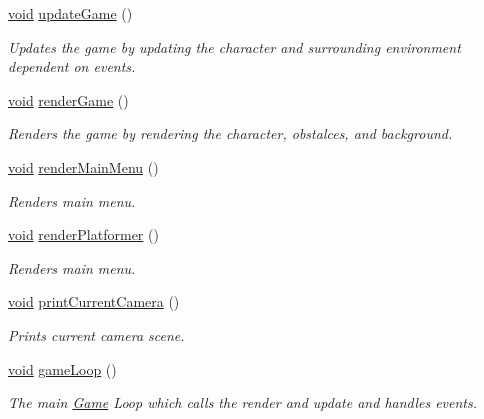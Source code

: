 \begin{DoxyCompactItemize}
\mbox{\hyperlink{_s_d_l__opengles2__gl2ext_8h_ae5d8fa23ad07c48bb609509eae494c95}{void}} \mbox{\hyperlink{class_game_a67a8c5c0356c9ad33fac1abc435a3746}{update\+Game}} ()
\begin{DoxyCompactList}\small\item\em Updates the game by updating the character and surrounding environment dependent on events. \end{DoxyCompactList}\item 
\mbox{\hyperlink{_s_d_l__opengles2__gl2ext_8h_ae5d8fa23ad07c48bb609509eae494c95}{void}} \mbox{\hyperlink{class_game_a4573580347746dbb7dbe568383682ed3}{render\+Game}} ()
\begin{DoxyCompactList}\small\item\em Renders the game by rendering the character, obstalces, and background. \end{DoxyCompactList}\item 
\mbox{\hyperlink{_s_d_l__opengles2__gl2ext_8h_ae5d8fa23ad07c48bb609509eae494c95}{void}} \mbox{\hyperlink{class_game_a9c9dea0cba2587b634793698e0e2d65c}{render\+Main\+Menu}} ()
\begin{DoxyCompactList}\small\item\em Renders main menu. \end{DoxyCompactList}\item 
\mbox{\hyperlink{_s_d_l__opengles2__gl2ext_8h_ae5d8fa23ad07c48bb609509eae494c95}{void}} \mbox{\hyperlink{class_game_a491f785f3a69e7d9d6539a384f00b28b}{render\+Platformer}} ()
\begin{DoxyCompactList}\small\item\em Renders main menu. \end{DoxyCompactList}\item 
\mbox{\hyperlink{_s_d_l__opengles2__gl2ext_8h_ae5d8fa23ad07c48bb609509eae494c95}{void}} \mbox{\hyperlink{class_game_a0aa4abcb959f9b7c4774fac5cb5f2162}{print\+Current\+Camera}} ()
\begin{DoxyCompactList}\small\item\em Prints current camera scene. \end{DoxyCompactList}\item 
\mbox{\hyperlink{_s_d_l__opengles2__gl2ext_8h_ae5d8fa23ad07c48bb609509eae494c95}{void}} \mbox{\hyperlink{class_game_aede5f46c8c7bbbaf8459eeec397a11e7}{game\+Loop}} ()
\begin{DoxyCompactList}\small\item\em The main \mbox{\hyperlink{class_game}{Game}} Loop which calls the render and update and handles events. \end{DoxyCompactList}\item 

\end{DoxyCompactItemize}
